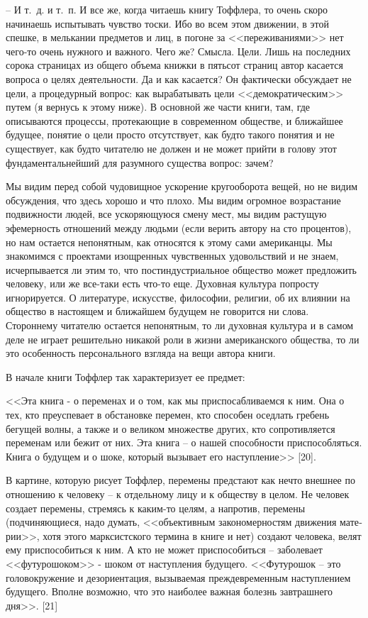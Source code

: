 \documentclass{book}
\begin{document}
-- И т.~д. и т.~п.
И все же, когда читаешь книгу Тоффлера, то очень скоро начинаешь испытывать чувство тоски. Ибо во всем этом движе­нии, в этой спешке, в мелькании предметов и лиц, в погоне за <<переживаниями>> нет чего-то очень нужного и важного. Чего же? Смысла. Цели.
Лишь на последних сорока страницах из общего объема книжки в пятьсот страниц автор касается вопроса о целях деятельности. Да и как касается? Он фактически обсуждает не цели, а  процедурный вопрос: как вырабатывать цели <<демократическим>> путем (я вернусь к этому ниже). В основной же части книги, там, где описываются процессы, протекающие в совре­менном обществе, и ближайшее будущее, понятие о цели просто отсутствует, как будто такого понятия и не существует, как будто читателю не должен и не может прийти в голову этот фундаментальнейший для разумного существа вопрос: зачем?

Мы видим перед собой чудовищное ускорение кругооборо­та вещей, но не видим обсуждения, что здесь хорошо и что пло­хо. Мы видим огромное возрастание подвижности людей, все ускоряющуюся смену мест, мы видим растущую эфемерность отношений между людьми (если верить автору на сто процен­тов), но нам остается непонятным, как относятся к этому са­ми американцы. Мы знакомимся с проектами изощренных чувственных удовольствий и не знаем, исчерпывается ли этим то, что постиндустриальное общество может предложить чело­веку, или же все-таки есть что-то еще. Духовная культура по­просту игнорируется. О литературе, искусстве, философии, ре­лигии, об их влиянии на общество в настоящем и ближайшем бу­дущем не говорится ни слова. Стороннему читателю остается не­понятным, то ли духовная культура и в самом деле не играет решительно никакой роли в жизни американского общества, то ли это особенность персонального взгляда на вещи автора книги.

В начале книги Тоффлер так характеризует ее предмет:

<<Эта книга - о переменах и о том, как мы приспосабливаем­ся к ним. Она о тех, кто преуспевает в обстановке перемен, кто способен оседлать гребень бегущей волны, а также и о великом множестве других, кто сопротивляется переменам или бежит от них. Эта книга -- о нашей способности приспособляться. Книга о будущем и о шоке, который вызывает его наступле­ние>> [20].

В картине, которую рисует Тоффлер, перемены предстают как нечто внешнее по отношению к человеку -- к отдельному лицу и к обществу в целом. Не человек создает перемены, стре­мясь к каким-то целям, а напротив, перемены (подчиняющиеся, надо думать, <<объективным закономерностям движения мате­рии>>, хотя этого марксистского термина в книге и нет) созда­ют человека, велят ему приспособиться к ним. А кто не может приспособиться -- заболевает <<футурошоком>> - шоком от на­ступления будущего. <<Футурошок -- это головокружение и де­зориентация, вызываемая преждевременным наступлением буду­щего. Вполне возможно, что это наиболее важная болезнь завт­рашнего дня>>. [21]
\end{document}
